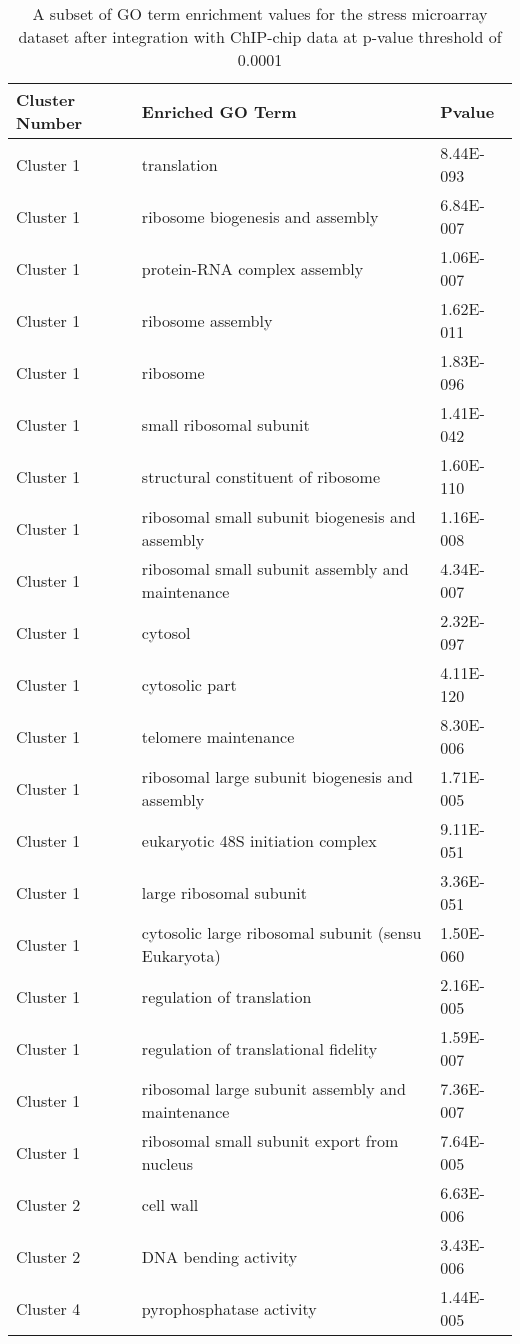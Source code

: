 \begin{table}[tp]
\centering
\begin{tabular}{|l|l|l|}
\hline
Cluster Number&Enriched GO Term&Pvalue\\
\hline
Cluster 1 &	translation                                              &	8.44E-093 \\ \hline
Cluster 1 &	ribosome biogenesis and assembly                         &	6.84E-007 \\ \hline
Cluster 1 &	protein-RNA complex assembly                             &	1.06E-007 \\ \hline
Cluster 1 &	ribosome assembly                                        &	1.62E-011 \\ \hline
Cluster 1 &	ribosome                                                 &	1.83E-096 \\ \hline 
Cluster 1 &	small ribosomal subunit					 &	1.41E-042 \\ \hline
Cluster 1 &	structural constituent of ribosome			 &	1.60E-110 \\ \hline
Cluster 1 &	ribosomal small subunit biogenesis and assembly		 &	1.16E-008 \\ \hline
Cluster 1 &	ribosomal small subunit assembly and maintenance	 &	4.34E-007 \\ \hline
Cluster 1 &	cytosol							 &	2.32E-097 \\ \hline 
Cluster 1 &	cytosolic part						 &	4.11E-120 \\ \hline
Cluster 1 &	telomere maintenance					 &	8.30E-006 \\ \hline
Cluster 1 &	ribosomal large subunit biogenesis and assembly		 &	1.71E-005 \\ \hline
Cluster 1 &	eukaryotic 48S initiation complex			 &	9.11E-051 \\ \hline
Cluster 1 &	large ribosomal subunit					 &	3.36E-051 \\ \hline
Cluster 1 &	cytosolic large ribosomal subunit (sensu Eukaryota)	 &	1.50E-060 \\ \hline
Cluster 1 &	regulation of translation				 &	2.16E-005 \\ \hline
Cluster 1 &	regulation of translational fidelity			 &	1.59E-007 \\ \hline
Cluster 1 &	ribosomal large subunit assembly and maintenance	 &	7.36E-007 \\ \hline
Cluster 1 &	ribosomal small subunit export from nucleus		 &	7.64E-005 \\ \hline
Cluster 2 &	cell wall						 &	6.63E-006 \\ \hline
Cluster 2 &	DNA bending activity					 &	3.43E-006 \\ \hline
Cluster 4 &	pyrophosphatase activity				 &	1.44E-005 \\ 
\hline

\end{tabular}
\caption[A subset of GO term enrichment values for the stress microarray dataset]{A subset of GO term enrichment values for the stress microarray dataset after integration with ChIP-chip data at p-value threshold of 0.0001}
\label{tab:stress_chip_0.0001}
\end{table}

